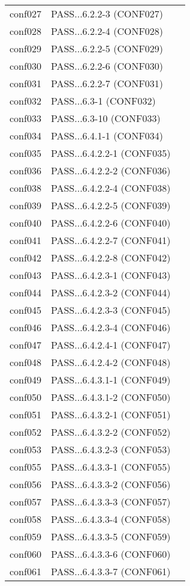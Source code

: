 \begin{tabular}{llc}
  conf027& PASS...6.2.2-3 (CONF027)&\\
  conf028& PASS...6.2.2-4 (CONF028)&\\
  conf029& PASS...6.2.2-5 (CONF029)&\\
  conf030& PASS...6.2.2-6 (CONF030)&\\
  conf031& PASS...6.2.2-7 (CONF031)&\\
  conf032& PASS...6.3-1 (CONF032)&\\
  conf033& PASS...6.3-10 (CONF033)&\\
  conf034& PASS...6.4.1-1 (CONF034)&\\
  conf035& PASS...6.4.2.2-1 (CONF035)&\\
  conf036& PASS...6.4.2.2-2 (CONF036)&\\
  conf038& PASS...6.4.2.2-4 (CONF038)&\\
  conf039& PASS...6.4.2.2-5 (CONF039)&\\
  conf040& PASS...6.4.2.2-6 (CONF040)&\\
  conf041& PASS...6.4.2.2-7 (CONF041)&\\
  conf042& PASS...6.4.2.2-8 (CONF042)&\\
  conf043& PASS...6.4.2.3-1 (CONF043)&\\
  conf044& PASS...6.4.2.3-2 (CONF044)&\\
  conf045& PASS...6.4.2.3-3 (CONF045)&\\
  conf046& PASS...6.4.2.3-4 (CONF046)&\\
  conf047& PASS...6.4.2.4-1 (CONF047)&\\
  conf048& PASS...6.4.2.4-2 (CONF048)&\\
  conf049& PASS...6.4.3.1-1 (CONF049)&\\
  conf050& PASS...6.4.3.1-2 (CONF050)&\\
  conf051& PASS...6.4.3.2-1 (CONF051)&\\
  conf052& PASS...6.4.3.2-2 (CONF052)&\\
  conf053& PASS...6.4.3.2-3 (CONF053)&\\
  conf055& PASS...6.4.3.3-1 (CONF055)&\\
  conf056& PASS...6.4.3.3-2 (CONF056)&\\
  conf057& PASS...6.4.3.3-3 (CONF057)&\\
  conf058& PASS...6.4.3.3-4 (CONF058)&\\
  conf059& PASS...6.4.3.3-5 (CONF059)&\\
  conf060& PASS...6.4.3.3-6 (CONF060)&\\
  conf061& PASS...6.4.3.3-7 (CONF061)&\\

\end{tabular}

